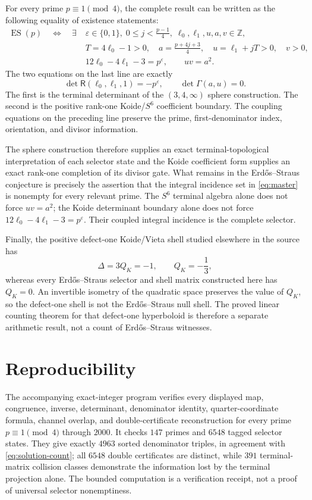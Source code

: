 \documentclass[11pt]{article}
\theoremstyle{definition}
\theoremstyle{remark}
\newcommand{\Z}{\mathbb Z}
\newcommand{\ES}{\operatorname{ES}}
\begin{document}
For every prime $p\equiv1\pmod4$, the complete result can be written as the
following equality of existence statements:
\begin{equation}\label{eq:master}
\boxed{
\begin{aligned}
\ES(p)
\quad\Longleftrightarrow\quad
\exists\;&\varepsilon\in\{0,1\},\;
0\le j<\frac{p-1}{4},\;
\ell_0,\ell_1,u,a,v\in\Z,\\
& T=4\ell_0-1>0,\quad
 a=\frac{p+4j+3}{4},\quad
 u=\ell_1+jT>0,\quad v>0,\\
&12\ell_0-4\ell_1-3=p^\varepsilon,\qquad
 uv=a^2.
\end{aligned}}
\end{equation}
The two equations on the last line are exactly
\[
 \det\mathsf R(\ell_0,\ell_1,1)=-p^\varepsilon,
 \qquad
 \det\Gamma(a,u)=0.
\]
The first is the terminal determinant of the $(3,4,\infty)$ sphere
construction.  The second is the positive rank-one Koide/$S^6$ coefficient
boundary.  The coupling equations on the preceding line preserve the prime,
first-denominator index, orientation, and divisor information.

The sphere construction therefore supplies an exact terminal-topological
interpretation of each selector state and the Koide coefficient form supplies
an exact rank-one completion of its divisor gate.  What remains in the
Erd\H{o}s--Straus conjecture is precisely the assertion that the integral
incidence set in \eqref{eq:master} is nonempty for every relevant prime.  The
$S^6$ terminal algebra alone does not force $uv=a^2$; the Koide determinant
boundary alone does not force
$12\ell_0-4\ell_1-3=p^\varepsilon$.  Their coupled integral incidence is the
complete selector.

Finally, the positive defect-one Koide/Vieta shell studied elsewhere in the
source has
\[
 \Delta=3Q_K=-1,
 \qquad Q_K=-\frac13,
\]
whereas every Erd\H{o}s--Straus selector and shell matrix constructed here has
$Q_K=0$.  An invertible isometry of the quadratic space preserves the value of
$Q_K$, so the defect-one shell is not the Erd\H{o}s--Straus null shell.  The
proved linear counting theorem for that defect-one hyperboloid is therefore a
separate arithmetic result, not a count of Erd\H{o}s--Straus witnesses.

\section*{Reproducibility}

The accompanying exact-integer program verifies every displayed map,
congruence, inverse, determinant, denominator identity, quarter-coordinate
formula, channel overlap, and double-certificate reconstruction for every
prime $p\equiv1\pmod4$ through $2000$.  It checks $147$ primes and $6548$
tagged selector states.  They give exactly $4963$ sorted denominator triples,
in agreement with \eqref{eq:solution-count}; all $6548$ double certificates
are distinct, while $391$ terminal-matrix collision classes demonstrate the
information lost by the terminal projection alone.  The bounded computation
is a verification receipt, not a proof of universal selector nonemptiness.
\end{document}
